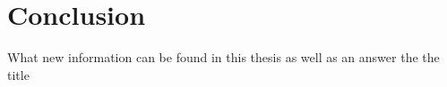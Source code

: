 \chapter{Conclusion}

What new information can be found in this thesis as well as an answer the the title